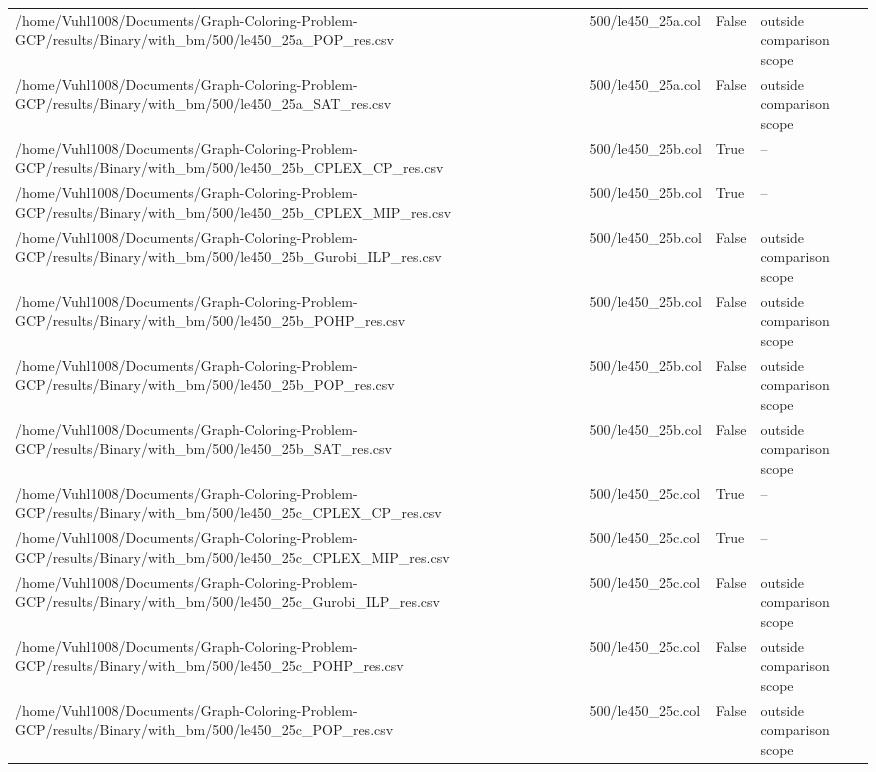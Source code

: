 \begin{table}[htbp]
\begin{tabular}{llll}
/home/Vuhl1008/Documents/Graph-Coloring-Problem-GCP/results/Binary/with\_bm/500/le450\_25a\_POP\_res.csv & 500/le450\_25a.col & False & outside comparison scope \\
/home/Vuhl1008/Documents/Graph-Coloring-Problem-GCP/results/Binary/with\_bm/500/le450\_25a\_SAT\_res.csv & 500/le450\_25a.col & False & outside comparison scope \\
/home/Vuhl1008/Documents/Graph-Coloring-Problem-GCP/results/Binary/with\_bm/500/le450\_25b\_CPLEX\_CP\_res.csv & 500/le450\_25b.col & True & -- \\
/home/Vuhl1008/Documents/Graph-Coloring-Problem-GCP/results/Binary/with\_bm/500/le450\_25b\_CPLEX\_MIP\_res.csv & 500/le450\_25b.col & True & -- \\
/home/Vuhl1008/Documents/Graph-Coloring-Problem-GCP/results/Binary/with\_bm/500/le450\_25b\_Gurobi\_ILP\_res.csv & 500/le450\_25b.col & False & outside comparison scope \\
/home/Vuhl1008/Documents/Graph-Coloring-Problem-GCP/results/Binary/with\_bm/500/le450\_25b\_POHP\_res.csv & 500/le450\_25b.col & False & outside comparison scope \\
/home/Vuhl1008/Documents/Graph-Coloring-Problem-GCP/results/Binary/with\_bm/500/le450\_25b\_POP\_res.csv & 500/le450\_25b.col & False & outside comparison scope \\
/home/Vuhl1008/Documents/Graph-Coloring-Problem-GCP/results/Binary/with\_bm/500/le450\_25b\_SAT\_res.csv & 500/le450\_25b.col & False & outside comparison scope \\
/home/Vuhl1008/Documents/Graph-Coloring-Problem-GCP/results/Binary/with\_bm/500/le450\_25c\_CPLEX\_CP\_res.csv & 500/le450\_25c.col & True & -- \\
/home/Vuhl1008/Documents/Graph-Coloring-Problem-GCP/results/Binary/with\_bm/500/le450\_25c\_CPLEX\_MIP\_res.csv & 500/le450\_25c.col & True & -- \\
/home/Vuhl1008/Documents/Graph-Coloring-Problem-GCP/results/Binary/with\_bm/500/le450\_25c\_Gurobi\_ILP\_res.csv & 500/le450\_25c.col & False & outside comparison scope \\
/home/Vuhl1008/Documents/Graph-Coloring-Problem-GCP/results/Binary/with\_bm/500/le450\_25c\_POHP\_res.csv & 500/le450\_25c.col & False & outside comparison scope \\
/home/Vuhl1008/Documents/Graph-Coloring-Problem-GCP/results/Binary/with\_bm/500/le450\_25c\_POP\_res.csv & 500/le450\_25c.col & False & outside comparison scope \\

\end{tabular}
\end{table}
